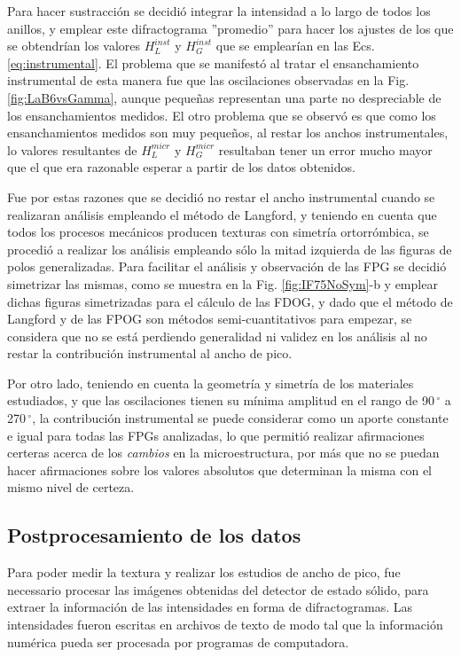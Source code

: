 Para hacer sustracción se decidió integrar la intensidad a lo largo de todos los anillos, y emplear este difractograma ''promedio'' para hacer los ajustes de los que se obtendrían los valores $H_L^{inst}$ y $H_G^{inst}$  que se emplearían en las Ecs. \ref{eq:instrumental}.
El problema que se manifestó al tratar el ensanchamiento instrumental de esta manera fue que las oscilaciones observadas en la Fig. \ref{fig:LaB6vsGamma}, aunque pequeñas representan una parte no despreciable de los ensanchamientos medidos.
El otro problema que se observó es que como los ensanchamientos medidos son muy pequeños, al restar los anchos instrumentales, lo valores resultantes de $H_L^{micr}$ y $H_G^{micr}$ resultaban tener un error mucho mayor que el que era razonable esperar a partir de los datos obtenidos.

Fue por estas razones que se decidió no restar el ancho instrumental cuando se realizaran análisis empleando el método de Langford, y teniendo en cuenta que todos los procesos mecánicos producen texturas con simetría ortorrómbica, se procedió a realizar los análisis empleando sólo la mitad izquierda de las figuras de polos generalizadas.
Para facilitar el análisis y observación de las FPG se decidió simetrizar las mismas, como se muestra en la Fig. \ref{fig:IF75NoSym}-b y emplear dichas figuras simetrizadas para el cálculo de las FDOG, y dado que el método de Langford y de las FPOG son métodos semi-cuantitativos para empezar, se considera que no se está perdiendo generalidad ni validez en los análisis al no restar la contribución instrumental al ancho de pico.

Por otro lado, teniendo en cuenta la geometría y simetría de los materiales estudiados, y que las oscilaciones tienen su mínima amplitud en el rango de 90\,$^{\circ}$ a 270\,$^{\circ}$, la contribución instrumental se puede considerar como un aporte constante e igual para todas las FPGs analizadas, lo que permitió realizar afirmaciones certeras acerca de los \textit{cambios} en la microestructura, por más que no se puedan hacer afirmaciones sobre los valores absolutos que determinan la misma con el mismo nivel de certeza.

\subsection{Postprocesamiento de los datos}\label{SS:MatPost}
Para poder medir la textura y realizar los estudios de ancho de pico, fue necessario procesar las imágenes obtenidas del detector de estado sólido, para extraer la información de las intensidades en forma de difractogramas. 
Las intensidades fueron escritas en archivos de texto de modo tal que la información numérica pueda ser procesada por programas de computadora.

